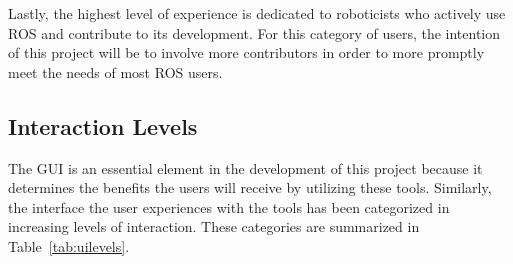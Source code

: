         Lastly, the highest level of experience is dedicated to roboticists who
        actively use \ac{ROS} and contribute to its development. For this 
        category of users, the intention of this project will be to involve more
        contributors in order to more promptly meet the needs of most \ac{ROS} users.


    \subsection{Interaction Levels}

        The \ac{GUI} is an essential element in the development of this project
        because it determines the benefits the users will receive by utilizing 
        these tools. Similarly, the interface the user experiences with the tools
        has been categorized in increasing levels of interaction. These categories
        are summarized in Table~\ref{tab:uilevels}.

